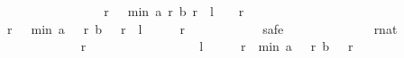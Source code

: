 \begin{isabellebody}
\ \ \ \ \ \ \isamarkupfalse%
{\isacharminus}\isanewline
\ \ \ \ \ \ \ \ \isamarkupfalse%
\ {\isachardoublequoteopen}{\isasymforall}\ r\ {\isacharless}\ {}{}{}{}{\isachardot}\ min\ {\isacharparenleft}a\ r{\isacharparenright}\ {\isacharparenleft}b\ r{\isacharparenright}\ {\isasymge}\ {\isacharquery}l\ {\isacharminus}\ {\isacharparenleft}{}{}{}{}\ {\isacharminus}\ r{\isacharparenright}{\isachardoublequoteclose}\isanewline
\ \ \ \ \ \ \ \ \isamarkupfalse%
{\isacharminus}\isanewline
\ \ \ \ \ \ \ \ \ \ \isamarkupfalse%
\ {\isachardoublequoteopen}{\isasymforall}\ r\ {\isacharless}\ {}{}{}{}{\isachardot}\ min\ {\isacharparenleft}a\ {\isacharparenleft}{}{}{}{}\ {\isacharminus}\ r{\isacharparenright}{\isacharparenright}\ {\isacharparenleft}b\ {\isacharparenleft}{}{}{}{}\ {\isacharminus}\ r{\isacharparenright}{\isacharparenright}\ {\isasymge}\ {\isacharquery}l\ {\isacharminus}\ {\isacharparenleft}{}{}{}{}\ {\isacharminus}\ {\isacharparenleft}{}{}{}{}\ {\isacharminus}\ r{\isacharparenright}{\isacharparenright}{\isachardoublequoteclose}\isanewline
\ \ \ \ \ \ \ \ \ \ \isamarkupfalse%
\ safe\isanewline
\ \ \ \ \ \ \ \ \ \ \ \ \isamarkupfalse%
\ r{\isacharcolon}{\isacharcolon}nat\isanewline
\ \ \ \ \ \ \ \ \ \ \ \ \isamarkupfalse%
\ {\isachardoublequoteopen}r\ {\isacharless}\ {}{}{}{}{\isachardoublequoteclose}\isanewline
\ \ \ \ \ \ \ \ \ \ \ \ \isamarkupfalse%
\ \isamarkupfalse%
\ {\isachardoublequoteopen}{\isacharquery}l\ {\isacharminus}\ {\isacharparenleft}{}{}{}{}\ {\isacharminus}\ {\isacharparenleft}{}{}{}{}\ {\isacharminus}\ r{\isacharparenright}{\isacharparenright}\ {\isasymle}\ min\ {\isacharparenleft}a\ {\isacharparenleft}{}{}{}{}\ {\isacharminus}\ r{\isacharparenright}{\isacharparenright}\ {\isacharparenleft}b\ {\isacharparenleft}{}{}{}{}\ {\isacharminus}\ r{\isacharparenright}{\isacharparenright}{\isachardoublequoteclose}\isanewline
\ \ \ \ \ \ \ \ \ \ \ \ \isamarkupfalse%

\end{isabellebody}
